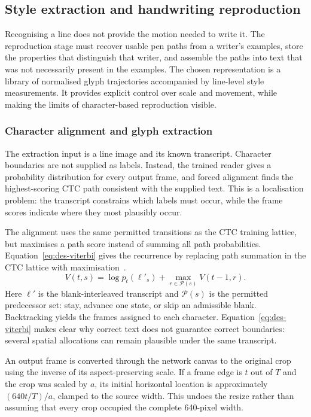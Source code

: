 \subsection{Style extraction and handwriting reproduction}
\label{sec:des-reproduction}
Recognising a line does not provide the motion needed to write it. The reproduction stage must recover usable pen paths from a writer's examples, store the properties that distinguish that writer, and assemble the paths into text that was not necessarily present in the examples. The chosen representation is a library of normalised glyph trajectories accompanied by line-level style measurements. It provides explicit control over scale and movement, while making the limits of character-based reproduction visible.

\subsubsection{Character alignment and glyph extraction}
\label{sec:des-alignment}
The extraction input is a line image and its known transcript. Character boundaries are not supplied as labels. Instead, the trained reader gives a probability distribution for every output frame, and forced alignment finds the highest-scoring CTC path consistent with the supplied text. This is a localisation problem: the transcript constrains which labels must occur, while the frame scores indicate where they most plausibly occur.

The alignment uses the same permitted transitions as the CTC training lattice, but maximises a path score instead of summing all path probabilities. Equation~\ref{eq:des-viterbi} gives the recurrence by replacing path summation in the CTC lattice with maximisation~\cite[PDF pp.~4--5]{graves2006}.
\begin{equation}
V(t,s)=\log p_t(\ell'_s)+\max_{r\in\mathcal P(s)}V(t-1,r).
\label{eq:des-viterbi}
\end{equation}
Here $\ell'$ is the blank-interleaved transcript and $\mathcal P(s)$ is the permitted predecessor set: stay, advance one state, or skip an admissible blank. Backtracking yields the frames assigned to each character. Equation~\ref{eq:des-viterbi} makes clear why correct text does not guarantee correct boundaries: several spatial allocations can remain plausible under the same transcript.

An output frame is converted through the network canvas to the original crop using the inverse of its aspect-preserving scale. If a frame edge is $t$ out of $T$ and the crop was scaled by $a$, its initial horizontal location is approximately $(640t/T)/a$, clamped to the source width. This undoes the resize rather than assuming that every crop occupied the complete 640-pixel width.

